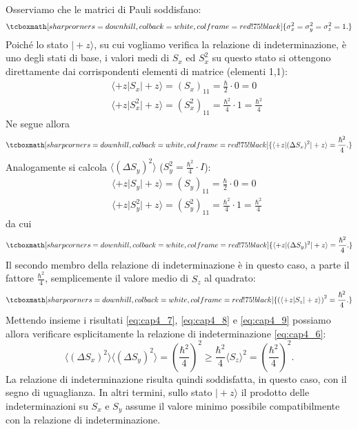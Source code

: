 Osserviamo che le matrici di Pauli soddisfano:
	\begin{equation}
		\tcboxmath[sharp corners=downhill ,colback=white,colframe=red!75!black]{
		\sigma _x ^2 = \sigma _y ^2 = \sigma _z ^2 =1.
		}
	\end{equation}
Poiché lo stato $\vert +z \rangle$, su cui vogliamo verifica la relazione di indeterminazione, è uno degli stati di base, i valori medi di $S_x$ ed $S_x ^2$ su questo stato si ottengono direttamente dai corrispondenti elementi di matrice (elementi 1,1):
	\begin{eqnarray}
		& &\displaystyle{\langle +z \vert S_x \vert +z \rangle = (S_x)_{11} = \frac{\hbar}{2}\cdot 0 =0}  \\
		& &\displaystyle{\langle +z \vert S_x ^2\vert +z \rangle = (S_x ^2)_{11} = \frac{\hbar ^2}{4}\cdot 1 =\frac{\hbar ^2}{4}} 
	\end{eqnarray}
Ne segue allora
	\begin{equation}
		\label{eq:cap4_7}
		\tcboxmath[sharp corners=downhill ,colback=white,colframe=red!75!black]{
			\langle +z \vert (\Delta S_x)^2\vert +z \rangle = \frac{\hbar ^2}{4}.
			}
	\end{equation}
Analogamente si calcola $\langle (\Delta S_y)^2 \rangle $ ($S_y ^2= \frac{\hbar ^2}{4}\cdot I$):
	\begin{eqnarray}
	& &\displaystyle{\langle +z \vert S_y \vert +z \rangle = (S_y)_{11} = \frac{\hbar}{2}\cdot 0 =0}  \\
	& &\displaystyle{\langle +z \vert S_y ^2\vert +z \rangle = (S_y ^2)_{11} = \frac{\hbar ^2}{4}\cdot 1 =\frac{\hbar ^2}{4}} \nonumber
	\end{eqnarray}
da cui
	\begin{equation}
		\label{eq:cap4_8}
		\tcboxmath[sharp corners=downhill ,colback=white,colframe=red!75!black]{
			\langle +z \vert (\Delta S_y)^2\vert +z \rangle = \frac{\hbar ^2}{4}.
			}
	\end{equation}
Il secondo membro della relazione di indeterminazione è in questo caso, a parte il fattore $\frac{\hbar ^2}{4}$, semplicemente il valore medio di $S_z$ al quadrato:
	\begin{equation}
		\label{eq:cap4_9}
		\tcboxmath[sharp corners=downhill ,colback=white,colframe=red!75!black]{
			\left( \langle +z \vert S_z \vert +z \rangle \right) ^2 = \frac{\hbar ^2}{4}.
			}
	\end{equation}
Mettendo insieme i risultati \eqref{eq:cap4_7}, \eqref{eq:cap4_8} e \eqref{eq:cap4_9} possiamo allora verificare esplicitamente la relazione di indeterminazione \eqref{eq:cap4_6}:
	\begin{equation}
		\langle  (\Delta S_x)^2 \rangle \langle(\Delta S_y)^2 \rangle = \left(\frac{\hbar ^2}{4} \right) ^2 \geq \frac{\hbar ^2}{4} \langle S_z  \rangle ^2 = \left(\frac{\hbar ^2}{4} \right) ^2.
	\end{equation}
La relazione di indeterminazione risulta quindi soddisfatta, in questo caso, con il segno di uguaglianza. In altri termini, sullo stato $\vert +z \rangle $ il prodotto delle indeterminazioni su $S_x$ e $S_y$ assume il valore minimo possibile compatibilmente con la relazione di indeterminazione.\\ \\

